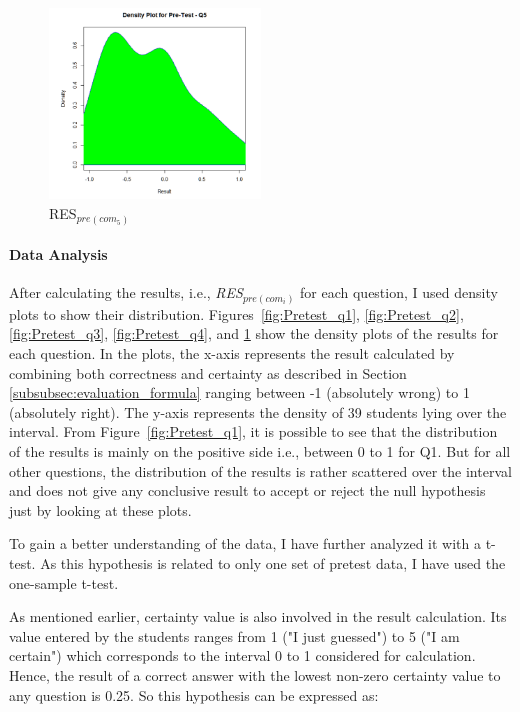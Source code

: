 \begin{figure}
	\centering
	\includegraphics[width=0.5\textwidth]{figures/Pretest_q5}
	\caption{RES$_{pre(com_5)}$}
	\label{fig:Pretest_q5}
\end{figure}

\paragraph{Data Analysis}
After calculating the results, i.e., \textit{RES$_{pre(com_i)}$} for each question, I used density plots to show their distribution. Figures~\ref{fig:Pretest_q1}, \ref{fig:Pretest_q2}, \ref{fig:Pretest_q3}, \ref{fig:Pretest_q4}, and \ref{fig:Pretest_q5} show the density plots of the results for each question. In the plots, the x-axis represents the result calculated by combining both correctness and certainty as described in Section \ref{subsubsec:evaluation_formula} ranging between -1 (absolutely wrong) to 1 (absolutely right). The y-axis represents the density of 39 students lying over the interval. From Figure~\ref{fig:Pretest_q1}, it is possible to see that the distribution of the results is mainly on the positive side i.e., between 0 to 1 for Q1. But for all other questions, the distribution of the results is rather scattered over the interval and does not give any conclusive result to accept or reject the null hypothesis just by looking at these plots.

To gain a better understanding of the data, I have further analyzed it with a t-test. As this hypothesis is related to only one set of pretest data, I have used the one-sample t-test.   

As mentioned earlier, certainty value is also involved in the result calculation. Its value entered by the students ranges from 1 ("I just guessed") to 5 ("I am certain") which corresponds to the interval 0 to 1 considered for calculation. Hence, the result of a correct answer with the lowest non-zero certainty value to any question is 0.25. So this hypothesis can be expressed as:   

